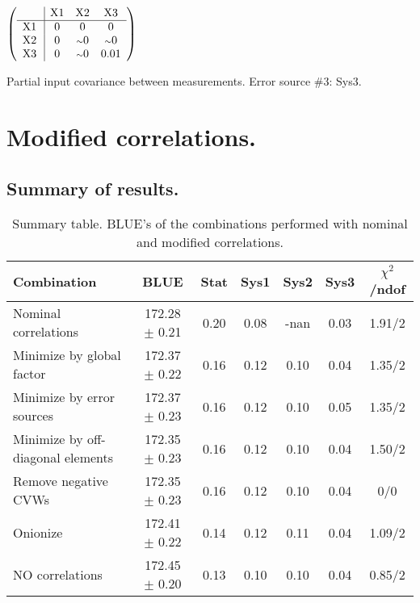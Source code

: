 \begin{table}[H]
\scriptsize
\begin{center}
\renewcommand{\arraystretch}{1.1}
\begin{math}\left(\begin{array}{c|ccc}
 & \mathrm{X1} & 
\mathrm{X2} & 
\mathrm{X3} \\
\hline
\mathrm{X1} \hspace*{2pt} &  0 &  0 &  0 \\
\mathrm{X2} \hspace*{2pt} &  0 &  {\scriptstyle \sim }0 &  {\scriptstyle \sim }0 \\
\mathrm{X3} \hspace*{2pt} &  0 &  {\scriptstyle \sim }0 &       0.01 \\
\end{array}\right)\end{math}
\caption{Partial input covariance between measurements. Error source \#3: Sys3.}
\renewcommand{\arraystretch}{1}
\end{center}
\end{table}
\clearpage
\section{Modified correlations.}
\subsection{Summary of results.}
\begin{table}[h]
\scriptsize
\begin{center}
\renewcommand{\arraystretch}{1.1}
\begin{tabular}{|l|c|cccc|c|}
\hline
Combination & BLUE & {\tiny Stat} & {\tiny Sys1} & {\tiny Sys2} & {\tiny Sys3} & {\tiny$\chi^2$/ndof} \\
\hline
Nominal correlations &     172.28 $\pm$      0.21 &       0.20 &       0.08 &       -nan &       0.03 &       1.91/2\\
\hline
Minimize by global factor &     172.37 $\pm$      0.22 &       0.16 &       0.12 &       0.10 &       0.04 &       1.35/2\\
Minimize by error sources &     172.37 $\pm$      0.23 &       0.16 &       0.12 &       0.10 &       0.05 &       1.35/2\\
Minimize by off-diagonal elements &     172.35 $\pm$      0.23 &       0.16 &       0.12 &       0.10 &       0.04 &       1.50/2\\
Remove negative CVWs &     172.35 $\pm$      0.23 &       0.16 &       0.12 &       0.10 &       0.04 &  0/0\\
Onionize &     172.41 $\pm$      0.22 &       0.14 &       0.12 &       0.11 &       0.04 &       1.09/2\\
\hline
NO correlations &     172.45 $\pm$      0.20 &       0.13 &       0.10 &       0.10 &       0.04 &       0.85/2\\
\hline
\end{tabular}
\renewcommand{\arraystretch}{1}
\caption{Summary table. BLUE's of the combinations performed with nominal and modified correlations.}
\end{center}
\end{table}

